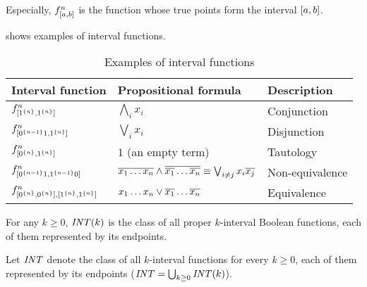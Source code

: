 
Especially,
$f^{n}_{[a, b]}$ is the function
whose true points form the interval $[a, b]$.

shows examples of interval functions.

\begin{table}[h]
\centering
\begin{tabular}{lll}
Interval function & Propositional formula & Description \\
\hline
$f^{n}_{[1^{\{n\}}, 1^{\{n\}}]}$ &
$\bigwedge_i{x_i}$ & Conjunction \\
$f^{n}_{[0^{\{n-1\}} 1, 1^{\{n\}}]}$ &
$\bigvee_i{x_i}$ & Disjunction \\
$f^{n}_{[0^{\{n\}}, 1^{\{n\}}]}$ &
$1$ (an empty term) & Tautology \\
$f^{n}_{[0^{\{n-1\}} 1, 1^{\{n-1\}} 0]}$ &
$\overline{x_1 \ldots x_n} \wedge
\overline{\overline{x_1} \ldots \overline{x_n}}
\equiv \bigvee_{i \neq j}{x_i \overline{x_j}}$ &
Non-equivalence \\
$f^n_{[0^{\{n\}}, 0^{\{n\}}],
[1^{\{n\}}, 1^{\{n\}}]}$ &
$x_1 \ldots x_n \vee \overline{x_1} \ldots \overline{x_n}$ &
Equivalence
\end{tabular}
\caption{Examples of interval functions}
\label{tab:exampleintfns}
\end{table}

\begin{definition}
[$\intervalfns{k}$]
\label{def:intervalfns}
For any $k \geq 0$,
$\intervalfns{k}$ is the class
of all proper $k$-interval Boolean functions,
each of them represented by its endpoints.
\end{definition}

\begin{definition}
[$\allintervalfns$]
\label{def:allintervalfns}
Let $\allintervalfns$ denote the class
of all $k$-interval functions for every $k \geq 0$,
each of them represented by its endpoints
($\mathit{INT} = \bigcup_{k \geq 0}{\mathit{INT} (k)}$).
\end{definition}

